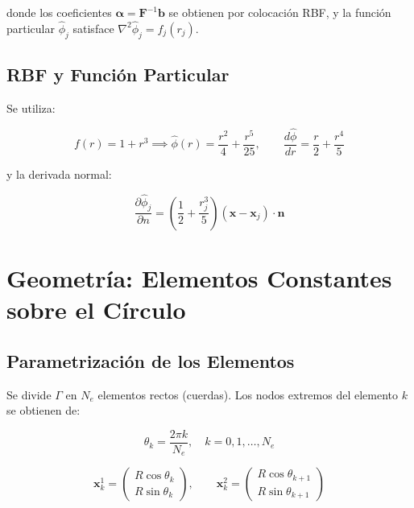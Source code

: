 \documentclass[12pt,a4paper]{article}
\begin{document}
donde los coeficientes $\boldsymbol{\alpha} = \mathbf{F}^{-1}\mathbf{b}$
se obtienen por colocación RBF, y la función particular $\hat{\phi}_j$
satisface $\nabla^2\hat{\phi}_j = f_j(r_j)$.

\subsection{RBF y Función Particular}

Se utiliza:

\begin{equation}
    f(r) = 1 + r^3 \implies
    \hat{\phi}(r) = \frac{r^2}{4} + \frac{r^5}{25}, \qquad
    \frac{d\hat{\phi}}{dr} = \frac{r}{2} + \frac{r^4}{5}
\end{equation}

y la derivada normal:

\begin{equation}
    \frac{\partial\hat{\phi}_j}{\partial n}
    = \left(\frac{1}{2} + \frac{r_j^3}{5}\right)
    (\mathbf{x} - \mathbf{x}_j)\cdot\mathbf{n}
\end{equation}

\section{Geometría: Elementos Constantes sobre el Círculo}

\subsection{Parametrización de los Elementos}

Se divide $\Gamma$ en $N_e$ elementos rectos (cuerdas). Los nodos extremos
del elemento $k$ se obtienen de:

\begin{equation}
    \theta_k = \frac{2\pi k}{N_e}, \quad k = 0, 1, \ldots, N_e
\end{equation}

\begin{equation}
    \mathbf{x}_k^1 = \begin{pmatrix} R\cos\theta_k \\ R\sin\theta_k \end{pmatrix},
    \qquad
    \mathbf{x}_k^2 = \begin{pmatrix} R\cos\theta_{k+1} \\ R\sin\theta_{k+1} \end{pmatrix}
\end{equation}
\end{document}
